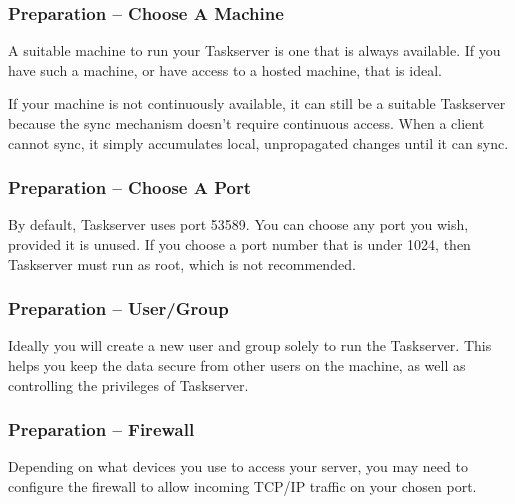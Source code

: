 \documentclass[t,handout]{beamer}
\begin{document}

\begin{frame}[fragile]\frametitle{Preparation -- Choose A  Machine}
    \vfill
	A suitable machine to run your Taskserver is one that is always available. If you have such a machine, or have access to a hosted machine, that is ideal.

	If your machine is not continuously available, it can still be a suitable Taskserver because the sync mechanism doesn't require continuous access. When a client cannot sync, it simply accumulates local, unpropagated changes until it can sync.
\end{frame}

\begin{frame}[fragile]\frametitle{Preparation -- Choose A  Port}
	\vfill
	By default, Taskserver uses port 53589. You can choose any port you wish, provided it is unused. If you choose a port number that is under 1024, then Taskserver must run as root, which is not recommended.
\end{frame}

\begin{frame}[fragile]\frametitle{Preparation -- User/Group}
	\vfill
    Ideally you will create a new user and group solely to run the Taskserver. This helps you keep the data secure from other users on the machine, as well as controlling the privileges of Taskserver.
\end{frame}

\begin{frame}[fragile]\frametitle{Preparation -- Firewall}
	\vfill
	Depending on what devices you use to access your server, you may need to configure the firewall to allow incoming TCP/IP traffic on your chosen port.
\end{frame}
\end{document}
